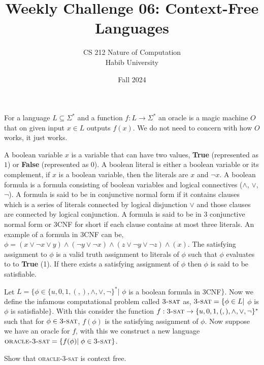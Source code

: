 \documentclass[a4paper]{exam}
\title{Weekly Challenge 06: Context-Free Languages}
\author{CS 212 Nature of Computation\\Habib University}
\date{Fall 2024}
\theoremstyle{theorem}
\theoremstyle{claim}
\begin{document}
\maketitle

\begin{questions}

    For a language $L \subseteq \Sigma^*$ and a function $f: L \to \Sigma^*$ an oracle is a magic machine $O$ that on given input $x \in L$ outputs $f(x)$. We do not need to concern with how $O$ works, it just works. 

    A boolean variable $x$ is a variable that can have two values, \textbf{True} (represented as $1$) or \textbf{False} (represented as $0$). A boolean literal is either a boolean variable or its complement, if $x$ is a boolean variable, then the literals are $x$ and $\neg x$. A boolean formula is a formula consisting of boolean variables and logical connectives ($\land$, $\lor$, $\neg$). A formula is said to be in conjunctive normal form if it contains clauses which is a series of literals connected by logical disjunction $\lor$ and those clauses are connected by logical conjunction. A formula is said to be in 3 conjunctive normal form or 3CNF for short if each clause contains at most three literals. An example of a formula in 3CNF can be, $\phi = (x \lor \neg x \lor y) \land (\neg y \lor \neg x) \land (z \lor \neg y \lor \neg z) \land (x)$. The satisfying assignment to $\phi$ is a valid truth assignment to literals of $\phi$ such that $\phi$ evaluates to to \textbf{True} (1). If there exists a satisfying assignment of $\phi$ then $\phi$ is said to be satisfiable.

    Let $L = \{\phi \in \{u,0,1,(,),\land, \lor, \neg\}^*|$ $\phi$ is a boolean formula in 3CNF$\}$. Now we define the infamous computational problem called $\textsc{3-sat}$ as, $\textsc{3-sat} = \{\phi \in L|$ $\phi$ is $\phi$ is satisfiable$\}$. With this consider the function $f:\textsc{3-sat} \to \{u,0,1,(,),\land, \lor, \neg\}^*$ such that for $\phi \in \textsc{3-sat}$, $f(\phi)$ is the satisfying assignment of $\phi$. Now suppose we have an oracle for $f$, with this we construct a new language $\textsc{oracle-3-sat} = \{f(\phi) | \; \phi \in \textsc{3-sat}\}$.
    
    Show that \textsc{oracle-3-sat} is context free.
    \begin{solution}

    \end{solution}
  
\end{questions}
\end{document}
